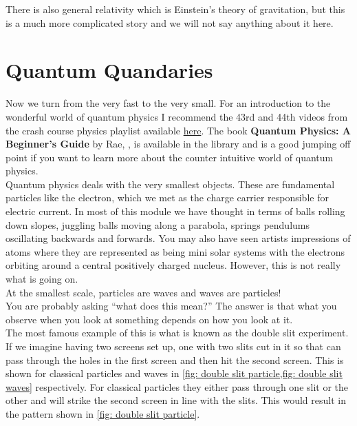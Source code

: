 There is also general relativity which is Einstein's theory of gravitation, but this is a much more complicated story and we will not say anything about it here.

\section{Quantum Quandaries}
Now we turn from the very fast to the very small.  For an introduction to the wonderful world of quantum physics I recommend the 43rd and 44th videos from the crash course physics playlist available \href{https://www.youtube.com/playlist?list=PL8dPuuaLjXtN0ge7yDk_UA0ldZJdhwkoV}{here}.  The book \textbf{Quantum Physics: A Beginner's Guide } by Rae, \citep{rae2005quantum}, is available in the library and is a good jumping off point if you want to learn more about the counter intuitive world of quantum physics.\\

Quantum physics deals with the very smallest objects. These are fundamental particles like the electron, which we met as the charge carrier responsible for electric current. In most of this module we have thought in terms of balls rolling down slopes, juggling balls moving along a parabola, springs pendulums oscillating backwards and forwards. You may also have seen artists impressions of atoms where they are represented as being mini solar systems with the electrons orbiting around a central positively charged nucleus.  However, this is not really what is going on.\\

At the smallest scale, particles are waves and waves are particles!\\

You are probably asking ``what does this mean?'' The answer is that what you observe when you look at something depends on how you look at it. \\

The most famous example of this is what is known as the double slit experiment. If we imagine having two screens set up, one with two slits cut in it so that can pass through the holes in the first screen and then hit the second screen. This is shown for classical particles and waves in \cref{fig: double slit particle,fig: double slit waves} respectively. For classical particles they either pass through one slit or the other and will strike the second screen in line with the slits. This would result in the pattern shown in \cref{fig: double slit particle}.\\


